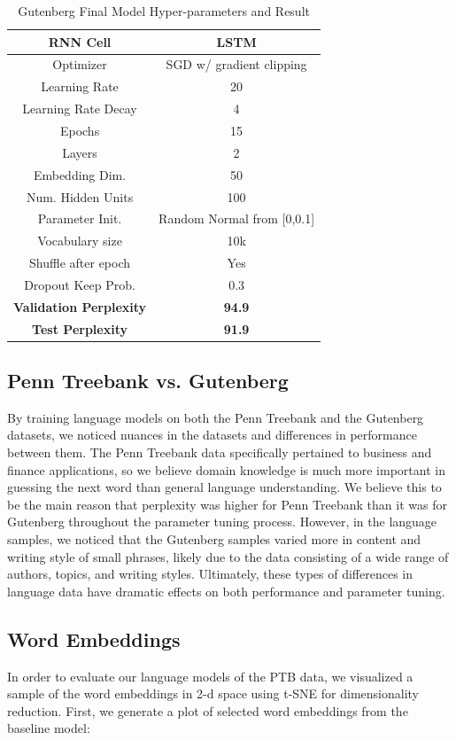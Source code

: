 \documentclass[a4paper]{article}
\begin{document}
\begin{table}[H]
\centering
\begin{tabular}{|c | c|} 
 \hline
RNN Cell & LSTM\\ \hline
Optimizer & SGD w/ gradient clipping \\ \hline
Learning Rate & 20 \\ \hline
Learning Rate Decay & 4 \\ \hline
Epochs & 15\\ \hline
Layers & 2\\ \hline
Embedding Dim. & 50\\ \hline
Num. Hidden Units & 100\\ \hline
Parameter Init. & Random Normal from [0,0.1]\\ \hline
Vocabulary size & 10k\\ \hline
Shuffle after epoch & Yes \\ \hline
Dropout Keep Prob. & 0.3 \\ \hline
\textbf{Validation Perplexity} &\textbf{94.9} \\ \hline
\textbf{Test Perplexity} &\textbf{91.9} \\ \hline
\end{tabular}
\caption{Gutenberg Final Model Hyper-parameters and Result}
\label{table:1}
\end{table}

\subsection{Penn Treebank vs. Gutenberg}
By training language models on both the Penn Treebank and the Gutenberg datasets, we noticed nuances in the datasets and differences in performance between them. The Penn Treebank data specifically pertained to business and finance applications, so we believe domain knowledge is much more important in guessing the next word than general language understanding. We believe this to be the main reason that perplexity was higher for Penn Treebank than it was for Gutenberg throughout the parameter tuning process. However, in the language samples, we noticed that the Gutenberg samples varied more in content and writing style of small phrases, likely due to the data consisting of a wide range of authors, topics, and writing styles. Ultimately, these types of differences in language data have dramatic effects on both performance and parameter tuning.

\subsection{Word Embeddings}
In order to evaluate our language models of the PTB data, we visualized a sample of the word embeddings in 2-d space using t-SNE for dimensionality reduction. First, we generate a plot of selected word embeddings from the baseline model:
\end{document}
